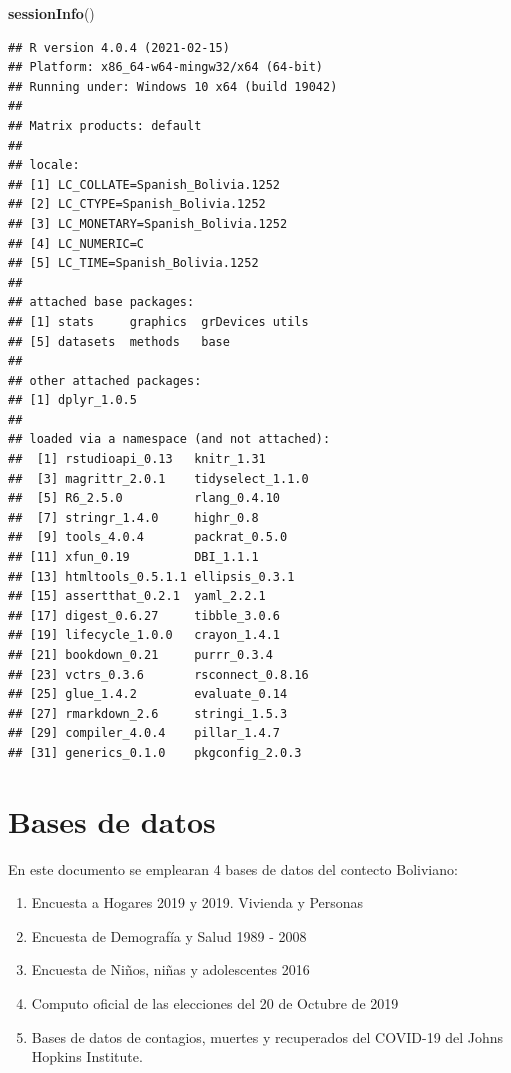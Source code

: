 \documentclass[
]{book}
\newenvironment{Shaded}{\begin{snugshade}}{\end{snugshade}}
\newcommand{\KeywordTok}[1]{\textcolor[rgb]{0.13,0.29,0.53}{\textbf{#1}}}
\newcommand{\NormalTok}[1]{#1}
\providecommand{\tightlist}{%
  \setlength{\itemsep}{0pt}\setlength{\parskip}{0pt}}
\begin{document}
\begin{Shaded}
\begin{Highlighting}[]
\KeywordTok{sessionInfo}\NormalTok{()}
\end{Highlighting}
\end{Shaded}

\begin{verbatim}
## R version 4.0.4 (2021-02-15)
## Platform: x86_64-w64-mingw32/x64 (64-bit)
## Running under: Windows 10 x64 (build 19042)
## 
## Matrix products: default
## 
## locale:
## [1] LC_COLLATE=Spanish_Bolivia.1252 
## [2] LC_CTYPE=Spanish_Bolivia.1252   
## [3] LC_MONETARY=Spanish_Bolivia.1252
## [4] LC_NUMERIC=C                    
## [5] LC_TIME=Spanish_Bolivia.1252    
## 
## attached base packages:
## [1] stats     graphics  grDevices utils    
## [5] datasets  methods   base     
## 
## other attached packages:
## [1] dplyr_1.0.5
## 
## loaded via a namespace (and not attached):
##  [1] rstudioapi_0.13   knitr_1.31       
##  [3] magrittr_2.0.1    tidyselect_1.1.0 
##  [5] R6_2.5.0          rlang_0.4.10     
##  [7] stringr_1.4.0     highr_0.8        
##  [9] tools_4.0.4       packrat_0.5.0    
## [11] xfun_0.19         DBI_1.1.1        
## [13] htmltools_0.5.1.1 ellipsis_0.3.1   
## [15] assertthat_0.2.1  yaml_2.2.1       
## [17] digest_0.6.27     tibble_3.0.6     
## [19] lifecycle_1.0.0   crayon_1.4.1     
## [21] bookdown_0.21     purrr_0.3.4      
## [23] vctrs_0.3.6       rsconnect_0.8.16 
## [25] glue_1.4.2        evaluate_0.14    
## [27] rmarkdown_2.6     stringi_1.5.3    
## [29] compiler_4.0.4    pillar_1.4.7     
## [31] generics_0.1.0    pkgconfig_2.0.3
\end{verbatim}

\hypertarget{bases-de-datos}{%
\section*{Bases de datos}\label{bases-de-datos}}

En este documento se emplearan 4 bases de datos del contecto Boliviano:

\begin{enumerate}
\def\labelenumi{\arabic{enumi}.}
\tightlist
\item
  Encuesta a Hogares 2019 y 2019. Vivienda y Personas
\item
  Encuesta de Demografía y Salud 1989 - 2008
\item
  Encuesta de Niños, niñas y adolescentes 2016
\item
  Computo oficial de las elecciones del 20 de Octubre de 2019
\item
  Bases de datos de contagios, muertes y recuperados del COVID-19 del Johns Hopkins Institute.
\end{enumerate}
\end{document}
